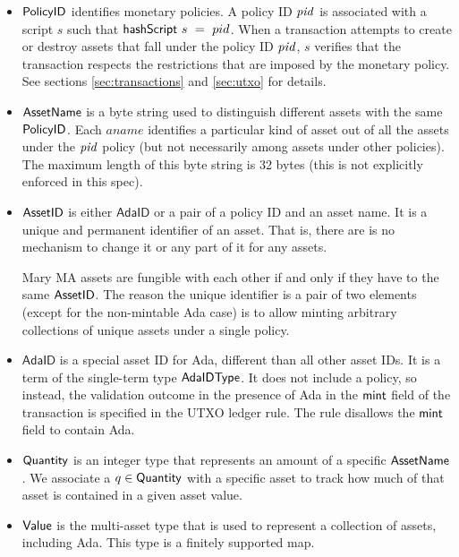 \begin{itemize}
  \item $\mathsf{PolicyID}$ identifies monetary policies. A policy ID $\mathit{pid}$ is associated with a script
    $s$ such that $\mathsf{hashScript}~s~=~pid$. When a transaction attempts to create or destroy assets
    that fall under the policy ID $\mathit{pid}$,
    $s$ verifies that the transaction
    respects the restrictions that are imposed by the monetary policy.
    See sections \ref{sec:transactions} and \ref{sec:utxo} for details.

  \item $\mathsf{AssetName}$ is a byte string used to distinguish different assets with the same $\mathsf{PolicyID}$.
    Each $aname$ identifies a particular kind of asset out of all the assets under the
    $\mathit{pid}$ policy (but not necessarily among assets under other policies).
    The maximum length of this
    byte string is 32 bytes (this is not explicitly enforced in this spec).

  \item $\mathsf{AssetID}$ is either $\mathsf{AdaID}$ or a pair of a policy ID and an asset name.
  It is a unique and permanent
  identifier of an asset. That is, there are is no mechanism to change it or
  any part of it for any assets.

  Mary MA assets are fungible with each other if and only if they have to the same $\mathsf{AssetID}$.
  The reason the unique identifier is a pair of two elements (except for the non-mintable Ada case) is to allow
  minting arbitrary collections of unique assets under a single policy.

  \item $\mathsf{AdaID}$ is a special asset ID for Ada, different than all other asset IDs.
  It is a term of the single-term type $\mathsf{AdaIDType}$.
  It does not include a policy, so instead, the validation outcome in the presence
  of Ada in the $\mathsf{mint}$ field of the transaction is specified in the UTXO
  ledger rule. The rule disallows the $\mathsf{mint}$ field to contain Ada.

  \item $\mathsf{Quantity}$ is an integer type that represents an amount of a specific $\mathsf{AssetName}$. We associate
    a $q\in\mathsf{Quantity}$ with a specific asset to track how much of that asset is contained in a given asset value.

  \item $\mathsf{Value}$ is the multi-asset type that is used to represent
    a collection of assets, including Ada. This type is a finitely supported map.


\end{itemize}
